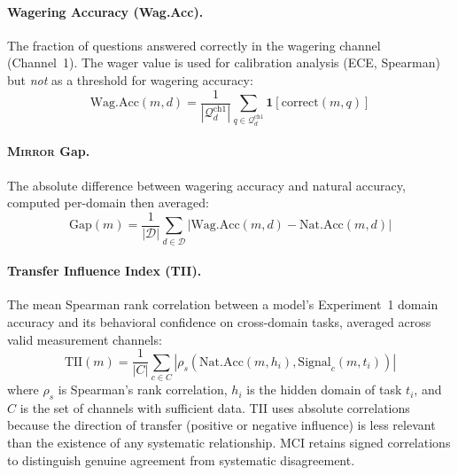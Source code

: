 \documentclass[10pt]{article}
\newcommand{\mirror}{\textsc{Mirror}}
\newcommand{\TII}{TII}
\begin{document}
\paragraph{Wagering Accuracy (Wag.Acc).}
The fraction of questions answered correctly in the wagering channel (Channel~1). The wager value is used for calibration analysis (ECE, Spearman) but \textit{not} as a threshold for wagering accuracy:
\begin{equation}
\text{Wag.Acc}(m, d) = \frac{1}{|\mathcal{Q}_d^{\text{ch1}}|} \sum_{q \in \mathcal{Q}_d^{\text{ch1}}} \mathbf{1}[\text{correct}(m, q)]
\end{equation}

\paragraph{\mirror{} Gap.}
The absolute difference between wagering accuracy and natural accuracy, computed per-domain then averaged:
\begin{equation}
\text{Gap}(m) = \frac{1}{|\mathcal{D}|} \sum_{d \in \mathcal{D}} |\text{Wag.Acc}(m, d) - \text{Nat.Acc}(m, d)|
\end{equation}

\paragraph{Transfer Influence Index (\TII{}).}
The mean Spearman rank correlation between a model's Experiment~1 domain accuracy and its behavioral confidence on cross-domain tasks, averaged across valid measurement channels:
\begin{equation}
\text{TII}(m) = \frac{1}{|C|} \sum_{c \in C} |\rho_s(\text{Nat.Acc}(m, h_i), \text{Signal}_c(m, t_i))|
\end{equation}
where $\rho_s$ is Spearman's rank correlation, $h_i$ is the hidden domain of task $t_i$, and $C$ is the set of channels with sufficient data.
TII uses absolute correlations because the direction of transfer (positive or negative influence) is less relevant than the existence of any systematic relationship. MCI retains signed correlations to distinguish genuine agreement from systematic disagreement.
\end{document}
